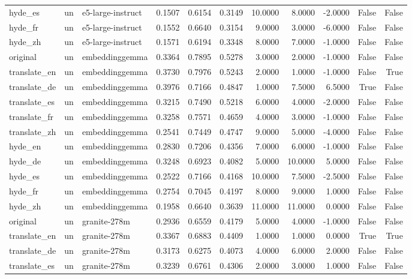 \begin{tabular}{lllrrrrrrrr}
hyde\_es & un & e5-large-instruct & 0.1507 & 0.6154 & 0.3149 & 10.0000 & 8.0000 & -2.0000 & False & False \\
hyde\_fr & un & e5-large-instruct & 0.1552 & 0.6640 & 0.3154 & 9.0000 & 3.0000 & -6.0000 & False & False \\
hyde\_zh & un & e5-large-instruct & 0.1571 & 0.6194 & 0.3348 & 8.0000 & 7.0000 & -1.0000 & False & False \\
original & un & embeddinggemma & 0.3364 & 0.7895 & 0.5278 & 3.0000 & 2.0000 & -1.0000 & False & False \\
translate\_en & un & embeddinggemma & 0.3730 & 0.7976 & 0.5243 & 2.0000 & 1.0000 & -1.0000 & False & True \\
translate\_de & un & embeddinggemma & 0.3976 & 0.7166 & 0.4847 & 1.0000 & 7.5000 & 6.5000 & True & False \\
translate\_es & un & embeddinggemma & 0.3215 & 0.7490 & 0.5218 & 6.0000 & 4.0000 & -2.0000 & False & False \\
translate\_fr & un & embeddinggemma & 0.3258 & 0.7571 & 0.4659 & 4.0000 & 3.0000 & -1.0000 & False & False \\
translate\_zh & un & embeddinggemma & 0.2541 & 0.7449 & 0.4747 & 9.0000 & 5.0000 & -4.0000 & False & False \\
hyde\_en & un & embeddinggemma & 0.2830 & 0.7206 & 0.4356 & 7.0000 & 6.0000 & -1.0000 & False & False \\
hyde\_de & un & embeddinggemma & 0.3248 & 0.6923 & 0.4082 & 5.0000 & 10.0000 & 5.0000 & False & False \\
hyde\_es & un & embeddinggemma & 0.2522 & 0.7166 & 0.4168 & 10.0000 & 7.5000 & -2.5000 & False & False \\
hyde\_fr & un & embeddinggemma & 0.2754 & 0.7045 & 0.4197 & 8.0000 & 9.0000 & 1.0000 & False & False \\
hyde\_zh & un & embeddinggemma & 0.1958 & 0.6640 & 0.3639 & 11.0000 & 11.0000 & 0.0000 & False & False \\
original & un & granite-278m & 0.2936 & 0.6559 & 0.4179 & 5.0000 & 4.0000 & -1.0000 & False & False \\
translate\_en & un & granite-278m & 0.3367 & 0.6883 & 0.4409 & 1.0000 & 1.0000 & 0.0000 & True & True \\
translate\_de & un & granite-278m & 0.3173 & 0.6275 & 0.4073 & 4.0000 & 6.0000 & 2.0000 & False & False \\
translate\_es & un & granite-278m & 0.3239 & 0.6761 & 0.4306 & 2.0000 & 3.0000 & 1.0000 & False & False \\

\end{tabular}
